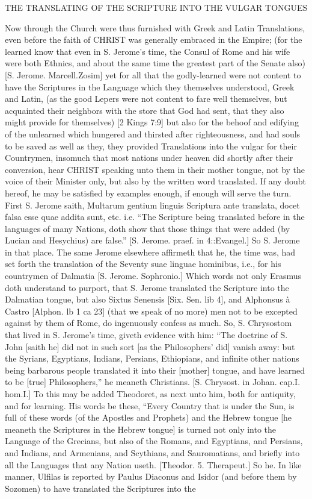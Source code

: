 {\par }{\IS THE TRANSLATING OF THE SCRIPTURE INTO THE VULGAR TONGUES
\par }{\IP Now through the Church were thus furnished with Greek and Latin Translations, even before the faith of CHRIST was generally embraced in the Empire; (for the learned know that even in S. Jerome’s time, the Consul of Rome and his wife were both Ethnics, and about the same time the greatest part of the Senate also) [S. Jerome. Marcell.Zosim] yet for all that the godly-learned were not content to have the Scriptures in the Language which they themselves understood, Greek and Latin, (as the good Lepers were not content to fare well themselves, but acquainted their neighbors with the store that God had sent, that they also might provide for themselves) [2 Kings 7:9] but also for the behoof and edifying of the unlearned which hungered and thirsted after righteousness, and had souls to be saved as well as they, they provided Translations into the vulgar for their Countrymen, insomuch that most nations under heaven did shortly after their conversion, hear CHRIST speaking unto them in their mother tongue, not by the voice of their Minister only, but also by the written word translated. If any doubt hereof, he may be satisfied by examples enough, if enough will serve the turn. First S. Jerome saith, Multarum gentium linguis Scriptura ante translata, docet falsa esse quae addita sunt, etc. i.e. “The Scripture being translated before in the languages of many Nations, doth show that those things that were added (by Lucian and Hesychius) are false.” [S. Jerome. praef. in 4::Evangel.] So S. Jerome in that place. The same Jerome elsewhere affirmeth that he, the time was, had set forth the translation of the Seventy suae linguae hominibus, i.e., for his countrymen of Dalmatia [S. Jerome. Sophronio.] Which words not only Erasmus doth understand to purport, that S. Jerome translated the Scripture into the Dalmatian tongue, but also Sixtus Senensis [Six. Sen. lib 4], and Alphonsus à Castro [Alphon. lb 1 ca 23] (that we speak of no more) men not to be excepted against by them of Rome, do ingenuously confess as much. So, S. Chrysostom that lived in S. Jerome’s time, giveth evidence with him: “The doctrine of S. John [saith he] did not in such sort [as the Philosophers’ did] vanish away: but the Syrians, Egyptians, Indians, Persians, Ethiopians, and infinite other nations being barbarous people translated it into their [mother] tongue, and have learned to be [true] Philosophers,” he meaneth Christians. [S. Chrysost. in Johan. cap.I. hom.I.] To this may be added Theodoret, as next unto him, both for antiquity, and for learning. His words be these, “Every Country that is under the Sun, is full of these words (of the Apostles and Prophets) and the Hebrew tongue [he meaneth the Scriptures in the Hebrew tongue] is turned not only into the Language of the Grecians, but also of the Romans, and Egyptians, and Persians, and Indians, and Armenians, and Scythians, and Sauromatians, and briefly into all the Languages that any Nation useth. [Theodor. 5. Therapeut.] So he. In like manner, Ulfilas is reported by Paulus Diaconus and Isidor (and before them by Sozomen) to have translated the Scriptures into the }
